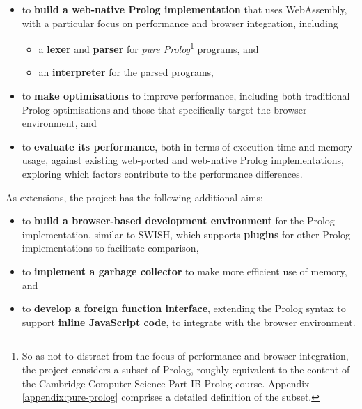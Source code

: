 \begin{itemize}
\item to \textbf{build a web-native Prolog implementation} that uses WebAssembly, with a particular focus on performance and browser integration, including
\begin{itemize}
\item a \textbf{lexer} and \textbf{parser} for \emph{pure Prolog}\footnote{So as not to distract from the focus of performance and browser integration, the project considers a subset of Prolog, roughly equivalent to the content of the Cambridge Computer Science Part IB Prolog course. Appendix \ref{appendix:pure-prolog} comprises a detailed definition of the subset.} programs, and
\item an \textbf{interpreter} for the parsed programs,
\end{itemize}
\item to \textbf{make optimisations} to improve performance, including both traditional Prolog optimisations and those that specifically target the browser environment, and
\item to \textbf{evaluate its performance}, both in terms of execution time and memory usage, against existing web-ported and web-native Prolog implementations, exploring which factors contribute to the performance differences.
\end{itemize}

As extensions, the project has the following additional aims:

\begin{itemize}
\item to \textbf{build a browser-based development environment} for the Prolog implementation, similar to SWISH, which supports \textbf{plugins} for other Prolog implementations to facilitate comparison,
\item to \textbf{implement a garbage collector} to make more efficient use of memory, and
\item to \textbf{develop a foreign function interface}, extending the Prolog syntax to support \textbf{inline JavaScript code}, to integrate with the browser environment.
\end{itemize}